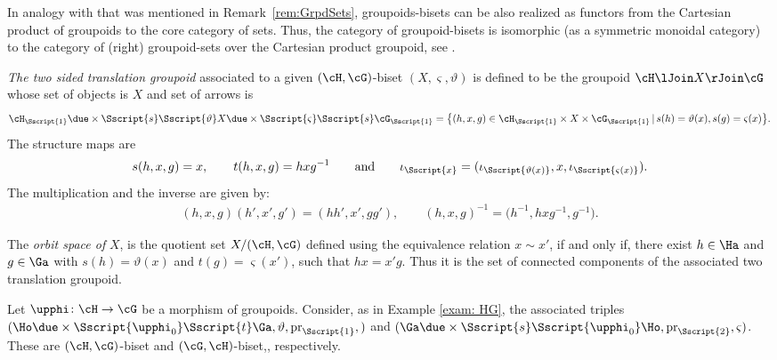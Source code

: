 In analogy with that was mentioned in Remark~\ref{rem:GrpdSets}, groupoids-bisets can be also realized as functors from the Cartesian product of groupoids to the core category of sets. Thus, the category of groupoid-bisets is isomorphic (as a symmetric monoidal category) to the category of (right) groupoid-sets over the Cartesian product groupoid, see \cite[Proposition~3.12]{Kaoutit/Spinosa:2018}.

\emph{The two sided translation groupoid} associated to a given $(\cH, \cG)$-biset $(X,\varsigma, \vartheta)$ is defined to be the groupoid $\cH \lJoin X \rJoin \cG$ whose set of objects is $X$ and set of arrows is
\begin{gather*}
\cH_{\Sscript{1}} \due \times {\Sscript{{s}}} {\Sscript{\vartheta}} X \due \times {\Sscript{\varsigma}}{\Sscript{{s}}} \cG_{\Sscript{1}} = \big\{ (h,x,g) \in\cH_{\Sscript{1}}\times X \times \cG_{\Sscript{1}}\,|\, {s}(h)= \vartheta(x), {s}(g)=\varsigma(x) \big\}.
\end{gather*}
The structure maps are
\begin{gather*}
{s}(h,x,g)=x,\qquad {t}(h,x,g)=hxg^{-1}\qquad \text{and}\qquad \iota_{\Sscript{x}}=(\iota_{\Sscript{\vartheta(x)}}, x,\iota_{\Sscript{\varsigma(x)}}).
\end{gather*}
The multiplication and the inverse are given by:
\begin{gather*}
(h,x,g) (h',x',g') = (hh',x',gg'),\qquad (h,x,g)^{-1}=\big(h^{-1}, hxg^{-1}, g^{-1}\big).
\end{gather*}

The \emph{orbit space of} $X$, is the quotient set $X / (\cH,\cG)$ defined using the equivalence relation $x \sim x'$, if and only if, there exist $h \in \Ha$ and $g \in \Ga$ with $s(h)=\vartheta(x)$ and $t(g)=\varsigma(x')$, such that $hx = x'g$. Thus it is the set of connected components of the associated two translation groupoid.

\begin{Example}\label{exam:bisets}Let $\upphi\colon \cH \to \cG$ be a morphism of groupoids. Consider, as in Example \ref{exam: HG}, the associated triples $(\Ho \due \times {\Sscript{\upphi_0}} { \Sscript{t}} \Ga, \vartheta, {\rm pr}_{\Sscript{1}},)$ and $(\Ga \due \times {\Sscript{s}} { \Sscript{\upphi_0}} \Ho, {\rm pr}_{\Sscript{2}}, \varsigma)$. These are $(\cH, \cG)$-biset and $(\cG,\cH)$-biset,, respectively.
\end{Example}

